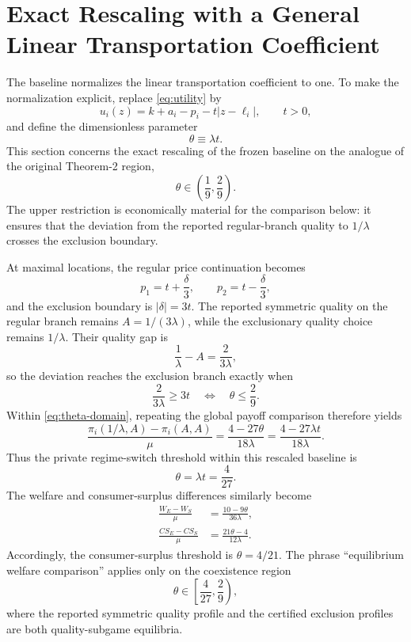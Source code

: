 \section{Exact Rescaling with a General Linear Transportation Coefficient}\label{sec:robustness}

The baseline normalizes the linear transportation coefficient to one. To make the normalization explicit, replace \eqref{eq:utility} by
\begin{equation}\label{eq:utility-t}
 u_i(z)=k+a_i-p_i-t|z-\ell_i|,
 \qquad t>0,
\end{equation}
and define the dimensionless parameter
\begin{equation}\label{eq:theta}
 \theta\equiv \lambda t.
\end{equation}
This section concerns the exact rescaling of the frozen baseline on the analogue of the original Theorem-2 region,
\begin{equation}\label{eq:theta-domain}
 \theta\in\left(\frac19,\frac29\right).
\end{equation}
The upper restriction is economically material for the comparison below: it ensures that the deviation from the reported regular-branch quality to $1/\lambda$ crosses the exclusion boundary.

At maximal locations, the regular price continuation becomes
\[
 p_1=t+\frac{\delta}{3},
 \qquad
 p_2=t-\frac{\delta}{3},
\]
and the exclusion boundary is $|\delta|=3t$. The reported symmetric quality on the regular branch remains $A=1/(3\lambda)$, while the exclusionary quality choice remains $1/\lambda$. Their quality gap is
\[
 \frac1\lambda-A=\frac{2}{3\lambda},
\]
so the deviation reaches the exclusion branch exactly when
\[
 \frac{2}{3\lambda}\geq 3t
 \quad\Longleftrightarrow\quad
 \theta\leq\frac29.
\]
Within \eqref{eq:theta-domain}, repeating the global payoff comparison therefore yields
\begin{equation}\label{eq:gain-t}
 \frac{\pi_i(1/\lambda,A)-\pi_i(A,A)}{\mu}
 =\frac{4-27\theta}{18\lambda}
 =\frac{4-27\lambda t}{18\lambda}.
\end{equation}
Thus the private regime-switch threshold within this rescaled baseline is
\begin{equation}\label{eq:threshold-t}
 \theta=\lambda t=\frac4{27}.
\end{equation}
The welfare and consumer-surplus differences similarly become
\begin{align}
 \frac{W_E-W_S}{\mu}&=\frac{10-9\theta}{36\lambda},\label{eq:w-t}\\
 \frac{CS_E-CS_S}{\mu}&=\frac{21\theta-4}{12\lambda}.\label{eq:cs-t}
\end{align}
Accordingly, the consumer-surplus threshold is $\theta=4/21$. The phrase ``equilibrium welfare comparison'' applies only on the coexistence region
\[
 \theta\in\left[\frac4{27},\frac29\right),
\]
where the reported symmetric quality profile and the certified exclusion profiles are both quality-subgame equilibria.

